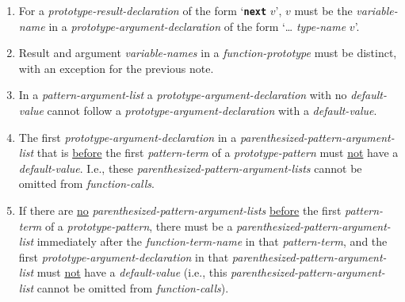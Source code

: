 \documentclass[12pt]{article}
\newcommand{\TT}[1]{{\tt \bfseries #1}}
\begin{document}
\begin{enumerate}
If the declaration contains a {\tt PTT\$\ldots} wild card
that is resolved into a list with {\em pointer-type-names},
the {\em prototype-result-declaration} \underline{after}
wild card substitution will necessarily have fewer
`\TT{@}'s than {\em pointer-type-names}.
\item
\label{PROTOTYPE-NEXT-RESULT}
For a {\em prototype-result-declaration} of the form `\TT{next} $v$',
$v$ must be the {\em vari\-able-name} in a {\em prototype-argument-declaration}
of the form `\dots{} {\em type-name} $v$'.
\item
Result and argument {\em variable-names}
in a {\em function-prototype} must
be distinct, with an exception for the previous note.
\item
In a {\em pattern-argument-list}
a {\em prototype-argument-declaration} with no {\em de\-fault-value} cannot
follow a {\em prototype-argument-declaration} with a {\em default-value}.
\item
The first {\em prototype-argument-declaration}
in a {\em parenthesized-pattern-argument-list} that is
\underline{before} the first {\em pattern-term} of a
{\em prototype-pattern} must \underline{not} have a {\em default-value}.
I.e., these {\em parenthesized-pattern-argument-lists} cannot be omitted from
{\em function-calls}.
\item
If there are \underline{no} {\em parenthesized-pattern-argument-lists}
\underline{before} the first {\em pattern-term} of a
{\em prototype-pattern}, there must be a
{\em parenthesized-pattern-argument-list}
immediately after the {\em function-term-name} in that {\em pattern-term},
and the first {\em prototype-argument-declaration} in that
{\em parenthesized-pattern-argument-list}
must \underline{not} have a {\em default-value}
(i.e., this {\em parenthesized-pattern-argument-list} cannot be omitted from
{\em function-calls}).


\end{enumerate}
\end{document}
